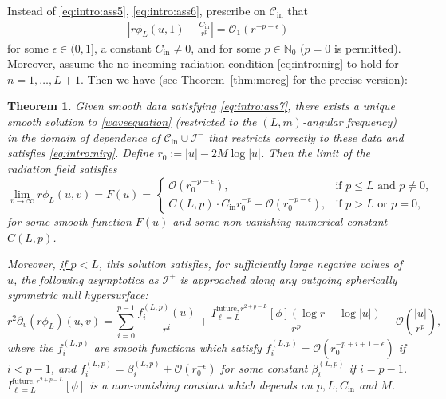 \documentclass[11pt,english]{article}
\numberwithin{equation}{section}
\newtheorem{thm}{Theorem}[section]
\theoremstyle{remark}
\theoremstyle{plain}
\theoremstyle{remark}
\newcommand{\pv}{\partial_v}
\renewcommand{\(}{\left(}
\renewcommand{\)}{\right)}
\begin{document}
Instead of \eqref{eq:intro:ass5}, \eqref{eq:intro:ass6}, prescribe on $\mathcal C_{\mathrm{in}}$ that
\begin{align}\label{eq:intro:ass7}
\left|r\phi_L(u,1)-\frac{C_{\mathrm{in}}}{r^p}\right|=\mathcal O_1( r^{-p-\epsilon})
\end{align}
for some $\epsilon\in(0,1]$, a constant $C_{\mathrm{in}}\neq 0$, and for some $p\in \mathbb N_0$ ($p=0$ is permitted). 
Moreover, assume the no incoming radiation condition \eqref{eq:intro:nirg} to hold for $n=1,\dots,L+1$. 
Then we have (see Theorem~\ref{thm:moreg} for the precise version):
	\begin{thm}\label{thm:intro:moreg}
	Given smooth data satisfying \eqref{eq:intro:ass7}, there exists a unique smooth solution to \eqref{waveequation} (restricted to the $(L,m)$-angular frequency) in the domain of dependence of $\mathcal C_{\mathrm{in}}\cup \mathcal{I}^-$ that restricts correctly to these data and satisfies \eqref{eq:intro:nirg}. 
	Define $r_0:=|u|-2M\log|u|$.
	Then the limit of the radiation field satisfies
	\begin{equation}\label{eq:intro:thma1}
	\lim_{v\to\infty}r\phi_L(u,v)=F(u)=\begin{cases}
													\mathcal O(r_0^{-p-\epsilon}),&\text{if }p\leq L \text{ and } p\neq 0,\\
													C(L,p)\cdot C_{\mathrm{in}} r_0^{-p}+\mathcal O(r_0^{-p-\epsilon}), &\text{if }p>L \text{ or } p=0,
										\end{cases}
	\end{equation}
	for some smooth function $F(u)$ and some non-vanishing numerical constant $C(L,p)$.
	
	Moreover, \underline{if $p<L$}, this solution satisfies, for sufficiently large negative values of $u$, the following asymptotics as $\mathcal{I}^+$ is approached along any outgoing spherically symmetric null hypersurface:
	\begin{equation}\label{eq:intro:thmb1}
	r^2\pv(r\phi_L)(u,v)=\sum_{i=0}^{p-1}\frac{f^{(L,p)}_i(u)}{r^i}+\frac{I_{\ell=L}^{\mathrm{future},r^{2+p-L}}[\phi](\log r-\log|u|)}{r^p}+\mathcal{O}\left(\frac{|u|}{r^{p}}\right),
	\end{equation}
	where the $f^{(L,p)}_i$ are smooth functions which satisfy $f^{(L,p)}_i=\mathcal O(r_0^{-p+i+1-\epsilon})$ if $i<p-1$, and $f^{(L,p)}_{i}=\beta_i^{(L,p)}+\mathcal O(r_0^{-\epsilon})$ for some constant $\beta_i^{(L,p)}$  if $i=p-1$. $I_{\ell=L}^{\mathrm{future},r^{2+p-L}}[\phi]$ is a non-vanishing constant which depends on $p,L,C_{\mathrm{in}}$ and $M$.
	

\end{thm}
\end{document}
